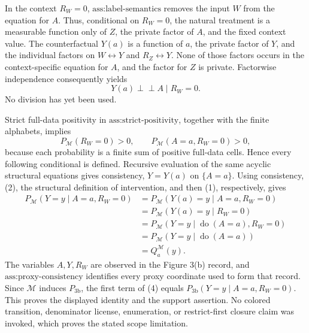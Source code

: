 In the context \(R_W=0\), \(\text{ass:label-semantics}\) removes the input \(W\) from the equation for \(A\). Thus, conditional on \(R_W=0\), the natural treatment is a measurable function only of \(Z\), the private factor of \(A\), and the fixed context value. The counterfactual \(Y(a)\) is a function of \(a\), the private factor of \(Y\), and the individual factors on \(W\leftrightarrow Y\) and \(R_Z\leftrightarrow Y\). None of those factors occurs in the context-specific equation for \(A\), and the factor for \(Z\) is private. Factorwise independence consequently yields
\[
Y(a)\mathbin{\perp\!\!\!\perp}A\mid R_W=0.
\tag{2}
\]
No division has yet been used.

Strict full-data positivity in \(\text{ass:strict-positivity}\), together with the finite alphabets, implies
\[
P_{\mathcal M}(R_W=0)>0,
\qquad
P_{\mathcal M}(A=a,R_W=0)>0,
\tag{3}
\]
because each probability is a finite sum of positive full-data cells. Hence every following conditional is defined. Recursive evaluation of the same acyclic structural equations gives consistency, \(Y=Y(a)\) on \(\{A=a\}\). Using consistency, (2), the structural definition of intervention, and then (1), respectively, gives
\[
\begin{aligned}
P_{\mathcal M}(Y=y\mid A=a,R_W=0)
&=P_{\mathcal M}(Y(a)=y\mid A=a,R_W=0)\\
&=P_{\mathcal M}(Y(a)=y\mid R_W=0)\\
&=P_{\mathcal M}(Y=y\mid\operatorname{do}(A=a),R_W=0)\\
&=P_{\mathcal M}(Y=y\mid\operatorname{do}(A=a))\\
&=Q_a^{\mathcal M}(y).
\end{aligned}
\tag{4}
\]
The variables \(A,Y,R_W\) are observed in the Figure 3(b) record, and \(\text{ass:proxy-consistency}\) identifies every proxy coordinate used to form that record. Since \(\mathcal M\) induces \(P_{\mathrm{3b}}\), the first term of (4) equals \(P_{\mathrm{3b}}(Y=y\mid A=a,R_W=0)\). This proves the displayed identity and the support assertion. No colored transition, denominator license, enumeration, or restrict-first closure claim was invoked, which proves the stated scope limitation.

